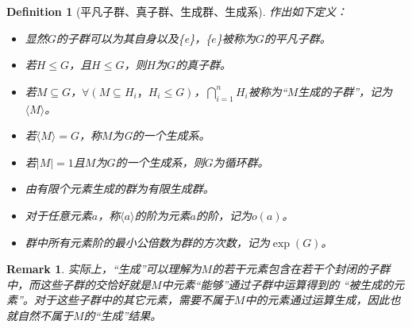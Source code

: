 \documentclass[12pt,a4paper,UTF8]{ctexbook}
\theoremstyle{plain}
\newtheorem{definition}{\indent Definition}[section]
\newtheorem{remark}{\indent Remark}[section]
\begin{document}
\begin{definition}[平凡子群、真子群、生成群、生成系]
    作出如下定义：
    \begin{itemize}
        \item 显然$G$的子群可以为其自身以及\{e\}，\{$e$\}被称为$G$的平凡子群。
        \item 若$H\leq G$，且$H\leq G$，则$H$为$G$的真子群。
        \item 若$M\subseteq G$，$\forall (M\subseteq H_i，H_i\leq G)$，$\bigcap_{i=1}^n H_i$被称为“$M$生成的子群”，记为$\langle M\rangle $。
        \item 若$\langle M\rangle =G$，称$M$为G的一个生成系。
        \item 若$|M|=1$且$M$为$G$的一个生成系，则$G$为循环群。
        \item 由有限个元素生成的群为有限生成群。
        \item 对于任意元素$a$，称$\langle a\rangle$的阶为元素$a$的阶，记为$o(a)$。
        \item 群中所有元素阶的最小公倍数为群的方次数，记为$\exp(G)$。
    \end{itemize}
\end{definition}
\begin{remark}
    实际上，“生成”可以理解为$M$的若干元素包含在若干个封闭的子群中，而这些子群的交恰好就是$M$中元素“能够”通过子群中运算得到的
    “被生成的元素”。对于这些子群中的其它元素，需要不属于$M$中的元素通过运算生成，因此也就自然不属于$M$的“生成”结果。
\end{remark}
\end{document}

